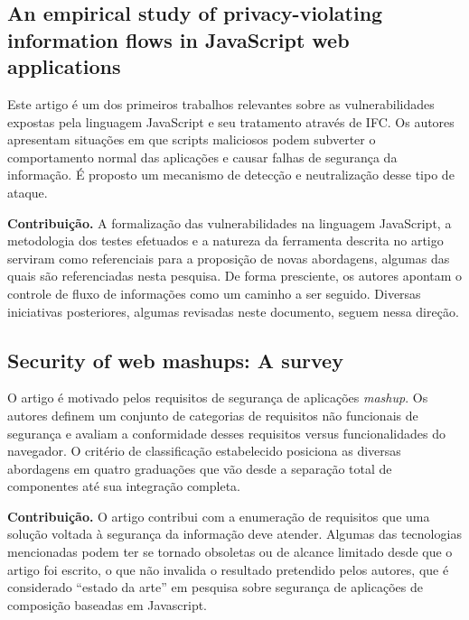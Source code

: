 \subsection{An empirical study of privacy-violating information flows in JavaScript web applications \cite{Jang2010}}
Este artigo é um dos primeiros trabalhos relevantes sobre as vulnerabilidades expostas pela linguagem JavaScript e seu tratamento através de IFC. Os autores apresentam situações em que scripts maliciosos podem subverter o comportamento normal das aplicações e causar falhas de segurança da informação. É proposto um mecanismo de detecção e neutralização desse tipo de ataque.

\textbf{Contribuição.} A formalização das vulnerabilidades na linguagem JavaScript, a metodologia dos testes efetuados e a natureza da ferramenta descrita no artigo serviram como referenciais para a proposição de novas abordagens, algumas das quais são referenciadas nesta pesquisa. De forma presciente, os autores apontam o controle de fluxo de informações como um caminho a ser seguido. Diversas iniciativas posteriores, algumas revisadas neste documento, seguem nessa direção.


\subsection{Security of web mashups: A survey \cite{DeRyck2012}}
O artigo é motivado pelos requisitos de segurança de aplicações \textit{mashup}. Os autores definem um conjunto de categorias de requisitos não funcionais de segurança e avaliam a conformidade desses requisitos versus funcionalidades do navegador. O critério de classificação estabelecido posiciona as diversas abordagens em quatro graduações que vão desde a separação total de componentes até sua integração completa.

\textbf{Contribuição.} O artigo contribui com a enumeração de requisitos que uma solução voltada à segurança da informação deve atender. Algumas das tecnologias mencionadas podem ter se tornado obsoletas ou de alcance limitado desde que o artigo foi escrito, o que não invalida o resultado pretendido pelos autores, que é considerado ``estado da arte''\cite{Hedin2014} em pesquisa sobre segurança de aplicações de composição baseadas em Javascript.


